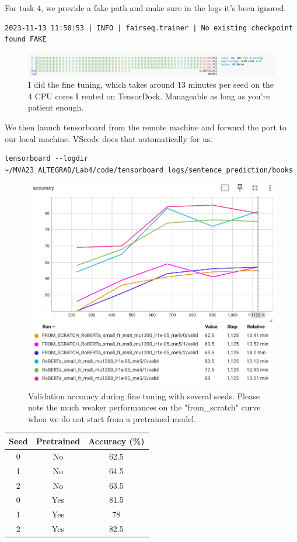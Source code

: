 \documentclass[a4paper]{article}
\begin{document}
For task 4, we provide a fake path and make sure in the logs it's been ignored.
\begin{verbatim}
2023-11-13 11:50:53 | INFO | fairseq.trainer | No existing checkpoint found FAKE
\end{verbatim}


\begin{figure}[ht]
    \centering
    \includegraphics[width=.6\textwidth]{figures/cpu_training.png}
    \caption{I did the fine tuning, which takes around 13 minutes per seed on the 4 CPU cores I rented on TensorDock.
        Manageable as long as you're patient enough.}
    \label{fig:training_cpu}
\end{figure}

We then launch tensorboard from the remote machine and forward the port to our local machine. VScode does that automatically for us.



\begin{verbatim}
tensorboard --logdir ~/MVA23_ALTEGRAD/Lab4/code/tensorboard_logs/sentence_prediction/books
\end{verbatim}

\begin{figure}[ht]
    \centering
    \includegraphics[width=.6\textwidth]{figures/training_roberta.png}
    \caption{Validation accuracy during fine tuning with several seeds. Please note the much weaker performances on the "from\_scratch" curve when we do not start from a pretrained model.}
    \label{fig:training_roberta}
\end{figure}

\begin{center}
    \begin{tabular}{||c c c |} 
     \hline
     Seed & Pretrained & Accuracy (\%) \\ [0.5ex] 
     \hline\hline
     0 & No & 62.5 \\ 
     \hline
     1 & No & 64.5  \\
     \hline
     2 & No & 63.5  \\
     \hline  \hline
     0 & Yes & 81.5 \\
     \hline
     1 & Yes & 78  \\
     \hline
     2 & Yes & 82.5  \\ 
     \hline
    \end{tabular}
\end{center}
\end{document}
